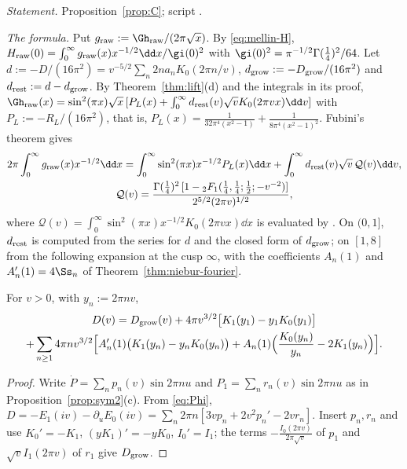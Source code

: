 \emph{Statement.} Proposition~\ref{prop:C}; script .

\emph{The formula.} Put $g_{\rm raw}:=\Gh_{\rm raw}/(2\pi\sqrt x)$. By \eqref{eq:mellin-H}, $H_{\rm raw}(0)=\int_0^\infty g_{\rm raw}(x)x^{-1/2}\dd x/\gi(0)^2$ with
$\gi(0)^2=\pi^{-1/2}\Gamma(\frac14)^2/64$. Let $d:=-D/(16\pi^2)=v^{-5/2}\sum_n2na_nK_0(2\pi n/v)$, $d_{\rm grow}:=-D_{\rm grow}/(16\pi^2)$ and
$d_{\rm rest}:=d-d_{\rm grow}$. By Theorem~\ref{thm:lift}(d) and the integrals in its proof, $\Gh_{\rm raw}(x)=\sin^2(\pi x)\sqrt x\,[P_L(x)+\int_0^\infty
d_{\rm rest}(v)\sqrt vK_0(2\pi vx)\dd v]$ with $P_L:=-R_L/(16\pi^2)$, that is, $P_L(x)=\frac1{32\pi^4(x^2-1)}+\frac1{8\pi^4(x^2-1)^2}$. Fubini's theorem gives
\begin{gather*}
2\pi\int_0^\infty g_{\rm raw}(x)x^{-1/2}\dd x=\int_0^\infty\sin^2(\pi x)x^{-1/2}P_L(x)\dd x+\int_0^\infty d_{\rm rest}(v)\sqrt v\,\mathcal Q(v)\dd v,\\
\mathcal Q(v)=\frac{\Gamma(\frac14)^2\,[1-{}_2F_1(\frac14,\frac14;\frac12;-v^{-2})]}{2^{5/2}(2\pi v)^{1/2}},
\end{gather*}
where $\mathcal Q(v)=\int_0^\infty\sin^2(\pi x)x^{-1/2}K_0(2\pi vx)\dd x$ is evaluated by \cite[6.699.12]{GR15}. On $(0,1]$, $d_{\rm rest}$ is computed from
the series for $d$ and the closed form of $d_{\rm grow}$; on $[1,8]$ from the following expansion at the cusp $\infty$, with the coefficients
$A_n(1)$ and $A_n'(1)=4\Ss_n$ of Theorem~\ref{thm:niebur-fourier}.

\begin{lemma}\label{lem:D-infinity}
For $v>0$, with $y_n:=2\pi nv$,
\begin{multline*}
D(v)=D_{\rm grow}(v)+4\pi v^{3/2}\big[K_1(y_1)-y_1K_0(y_1)\big]\\
+\sum_{n\ge1}4\pi nv^{3/2}\Big[A_n'(1)\big(K_1(y_n)-y_nK_0(y_n)\big)+A_n(1)\Big(\frac{K_0(y_n)}{y_n}-2K_1(y_n)\Big)\Big].
\end{multline*}
\end{lemma}

\begin{proof}
Write $\dot P=\sum_np_n(v)\sin2\pi nu$ and $P_1=\sum_nr_n(v)\sin2\pi nu$ as in Proposition~\ref{prop:sym2}(c). From \eqref{eq:Phi},
$D=-E_1(iv)-\partial_uE_0(iv)=\sum_n2\pi n[3vp_n+2v^2p_n'-2vr_n]$. Insert $p_n,r_n$ and use $K_0'=-K_1$, $(yK_1)'=-yK_0$, $I_0'=I_1$; the terms
$-\frac{I_0(2\pi v)}{2\pi\sqrt v}$ of $p_1$ and $\sqrt vI_1(2\pi v)$ of $r_1$ give $D_{\rm grow}$.
\end{proof}

